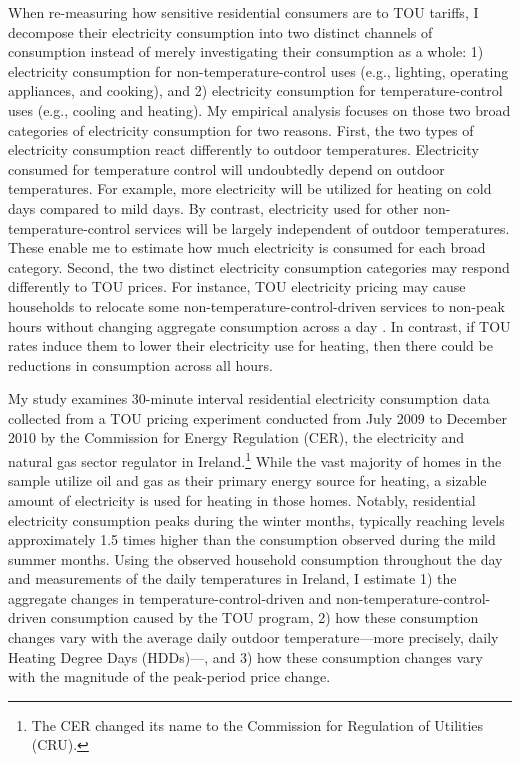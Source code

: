 When re-measuring how sensitive residential consumers are to TOU tariffs, I decompose their electricity consumption into two distinct channels of consumption instead of merely investigating their consumption as a whole: 1) electricity consumption for non-temperature-control uses (e.g., lighting, operating appliances, and cooking), and 2) electricity consumption for temperature-control uses (e.g., cooling and heating). My empirical analysis focuses on those two broad categories of electricity consumption for two reasons. First, the two types of electricity consumption react differently to outdoor temperatures. Electricity consumed for temperature control will undoubtedly depend on outdoor temperatures. For example, more electricity will be utilized for heating on cold days compared to mild days. By contrast, electricity used for other non-temperature-control services will be largely independent of outdoor temperatures. These enable me to estimate how much electricity is consumed for each broad category. Second, the two distinct electricity consumption categories may respond differently to TOU prices. For instance, TOU electricity pricing may cause households to relocate some non-temperature-control-driven services to non-peak hours without changing aggregate consumption across a day \citep{Residential-Response-to-Critical-Peak-Pricing-of-Electricity_California-Evidence_Herter-and-Wayland_2010, Empowering-Consumers-through-Data-and-Smart-Technology_HML_2016}. In contrast, if TOU rates induce them to lower their electricity use for heating, then there could be reductions in consumption across all hours. 

My study examines 30-minute interval residential electricity consumption data collected from a TOU pricing experiment conducted from July 2009 to December 2010 by the Commission for Energy Regulation (CER), the electricity and natural gas sector regulator in Ireland.\footnote{The CER changed its name to the Commission for Regulation of Utilities (CRU).} While the vast majority of homes in the sample utilize oil and gas as their primary energy source for heating, a sizable amount of electricity is used for heating in those homes. Notably, residential electricity consumption peaks during the winter months, typically reaching levels approximately 1.5 times higher than the consumption observed during the mild summer months. Using the observed household consumption throughout the day and measurements of the daily temperatures in Ireland, I estimate 1) the aggregate changes in temperature-control-driven and non-temperature-control-driven consumption caused by the TOU program, 2) how these consumption changes vary with the average daily outdoor temperature---more precisely, daily Heating Degree Days (HDDs)---, and 3) how these consumption changes vary with the magnitude of the peak-period price change.  

